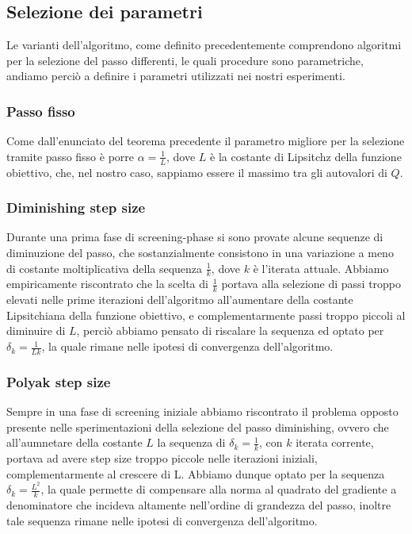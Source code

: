\documentclass[12pt]{extarticle}
\begin{document}
\subsection{Selezione dei parametri}
Le varianti dell'algoritmo, come definito precedentemente comprendono algoritmi per la selezione del passo differenti, le quali procedure sono parametriche, andiamo perciò a definire i parametri utilizzati nei nostri esperimenti.
\subsubsection{Passo fisso}
Come dall'enunciato del teorema precedente il parametro migliore per la selezione tramite passo fisso è porre $\alpha = \frac{1}{L}$, dove $L$ è la costante di Lipsitchz della funzione obiettivo, che, nel nostro caso, sappiamo essere il massimo tra gli autovalori di $Q$.
\subsubsection{Diminishing step size}
Durante una prima fase di screening-phase si sono provate alcune sequenze di diminuzione del passo, che sostanzialmente consistono in una variazione a meno di costante moltiplicativa della sequenza $\frac{1}{k}$, dove $k$ è l'iterata attuale. Abbiamo empiricamente riscontrato che la scelta di $\frac{1}{k}$ portava alla selezione di passi troppo elevati nelle prime iterazioni dell'algoritmo all'aumentare della costante Lipsitchiana della funzione obiettivo, e complementarmente passi troppo piccoli al diminuire di $L$, perciò abbiamo pensato di riscalare la sequenza ed optato per $\delta_k = \frac{1}{Lk}$, la quale rimane nelle ipotesi di convergenza dell'algoritmo.
\subsubsection{Polyak step size}
Sempre in una fase di screening iniziale abbiamo riscontrato il problema opposto presente nelle sperimentazioni della selezione del passo diminishing, ovvero che all'aumnetare della costante $L$ la sequenza di $\delta_k = \frac{1}{k}$, con $k$ iterata corrente, portava ad avere step size troppo piccole nelle iterazioni iniziali, complementarmente al crescere di L. Abbiamo dunque optato per la sequenza $\delta_k = \frac{L^2}{k}$, la quale permette di compensare alla norma al quadrato del gradiente a denominatore che incideva altamente nell'ordine di grandezza del passo, inoltre tale sequenza rimane nelle ipotesi di convergenza dell'algoritmo.
\end{document}
